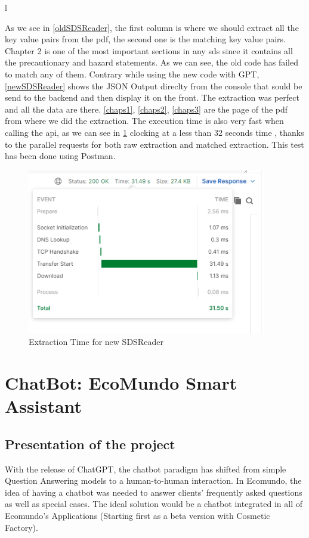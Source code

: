 l\documentclass[a4paper,12pt,twoside]{report}
\begin{document}
As we see in \ref{oldSDSReader}, the first column is where we should extract all the key value pairs from the pdf, the second one is the matching key value pairs. Chapter 2 is one of the most important sections in any sds since it contains all the precautionary and hazard statements. As we can see, the old code has failed to match any of them.
Contrary while using the new code with GPT, \ref{newSDSReader} shows the JSON Output direclty from the console that sould be send to the backend and then display it on the front. The extraction was perfect and all the data are there. \ref{chaps1}, \ref{chaps2}, \ref{chaps3} are the page of the pdf from where we did the extraction.
The execution time is also very fast when calling the api, as we can see in \ref{sdsTimeResponse} clocking at a less than 32 seconds time , thanks to the parallel requests for both raw extraction and matched extraction. This test has been done using Postman.
\begin{figure}[H]
		\includegraphics[width=\textwidth, keepaspectratio ]{images/sdsTimeResponse}
	\caption[sdsTimeResponse]{Extraction Time for new SDSReader}
\label{sdsTimeResponse}
\end{figure}	

\section{ChatBot: EcoMundo Smart Assistant}\label{chatbot}
\subsection{Presentation of the project}
With the release of ChatGPT, the chatbot paradigm has shifted from simple Question Answering models to a human-to-human interaction. 
In Ecomundo, the idea of having a chatbot was needed to answer clients' frequently asked questions as well as special cases. The ideal solution would be a chatbot integrated in all of Ecomundo's Applications (Starting first as a beta version with Cosmetic Factory).
\end{document}
